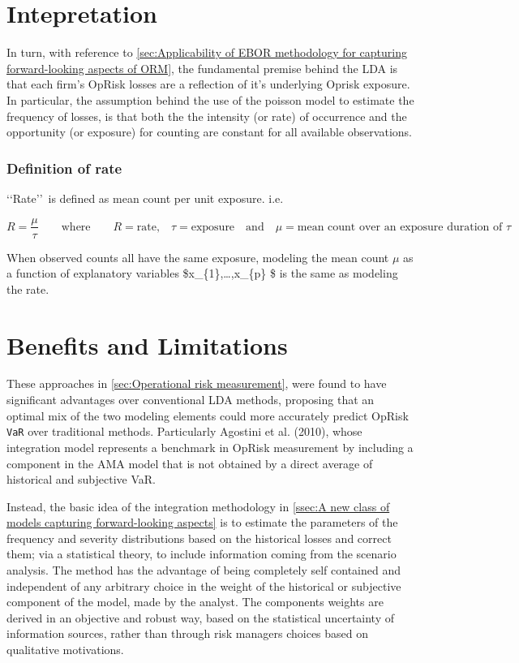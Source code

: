 \documentclass[]{DissertateUSU}
\begin{document}
\section{Intepretation}
\label{sec:Intepretation}

In turn, with reference to
\ref{sec:Applicability of EBOR methodology for capturing forward-looking aspects of ORM},
the fundamental premise behind the LDA is that each firm's OpRisk losses
are a reflection of it's underlying Oprisk exposure. In particular, the
assumption behind the use of the poisson model to estimate the frequency
of losses, is that both the the intensity (or rate) of occurrence and
the opportunity (or exposure) for counting are constant for all
available observations.

\subsubsection{Definition of rate}

\lq\lq Rate\rq\rq~is defined as mean count per unit exposure. i.e.

\begin{equation}
R = \frac{\mu}{\tau} \qquad \mbox{where} \qquad \mbox{$R = $rate,} \quad \mbox{$\tau = $exposure} \quad \mbox{and} \quad \mbox{$\mu = $mean count over an exposure duration of $\tau$} \nonumber
\end{equation}

When observed counts all have the same exposure, modeling the mean count
\(\mu\) as a function of explanatory variables
\$x\_\{1\},\ldots,x\_\{p\} \$ is the same as modeling the rate.

\section{Benefits and Limitations}
\label{sec:Benefits and Limitations}

These approaches in \ref{sec:Operational risk measurement}, were found
to have significant advantages over conventional LDA methods, proposing
that an optimal mix of the two modeling elements could more accurately
predict OpRisk \texttt{VaR} over traditional methods. Particularly
Agostini et al. (2010), whose integration model represents a benchmark
in OpRisk measurement by including a component in the AMA model that is
not obtained by a direct average of historical and subjective
VaR.\medskip

Instead, the basic idea of the integration methodology in
\ref{ssec:A new class of models capturing forward-looking aspects} is to
estimate the parameters of the frequency and severity distributions
based on the historical losses and correct them; via a statistical
theory, to include information coming from the scenario analysis. The
method has the advantage of being completely self contained and
independent of any arbitrary choice in the weight of the historical or
subjective component of the model, made by the analyst. The components
weights are derived in an objective and robust way, based on the
statistical uncertainty of information sources, rather than through risk
managers choices based on qualitative motivations. \medskip
\end{document}
